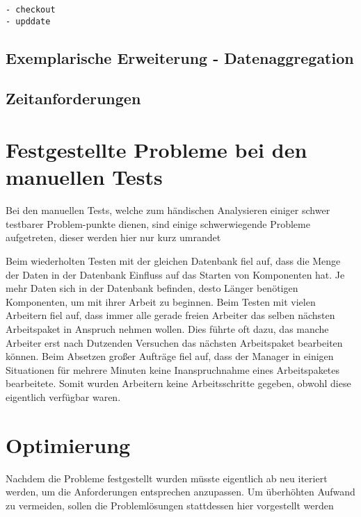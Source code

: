 \begin{verbatim}
- checkout
- upddate
\end{verbatim}

\subsection{Exemplarische Erweiterung - Datenaggregation}

\subsection{Zeitanforderungen}

\section{Festgestellte Probleme bei den manuellen Tests}

Bei den manuellen Tests, welche zum händischen Analysieren
einiger schwer testbarer Problem-punkte dienen,
sind einige schwerwiegende Probleme aufgetreten,
dieser werden hier nur kurz umrandet 

\begin{description}
        Beim wiederholten Testen mit der gleichen Datenbank fiel auf, dass die Menge der Daten in der Datenbank Einfluss auf das Starten von Komponenten hat. Je mehr Daten sich in der Datenbank befinden, desto Länger benötigen Komponenten, um mit ihrer Arbeit zu beginnen.
        Beim Testen mit vielen Arbeitern fiel auf, dass immer alle gerade freien Arbeiter das selben nächsten Arbeitspaket in Anspruch nehmen wollen. Dies führte oft dazu, das manche Arbeiter erst nach Dutzenden Versuchen das nächsten Arbeitspaket bearbeiten können.
        Beim Absetzen großer Aufträge fiel auf, dass der Manager in einigen Situationen für mehrere Minuten keine Inanspruchnahme eines Arbeitspaketes bearbeitete. Somit wurden Arbeitern keine Arbeitsschritte gegeben, obwohl diese eigentlich verfügbar waren.
\end{description}

\section{Optimierung}

Nachdem die Probleme festgestellt wurden
müsste eigentlich ab  neu iteriert werden,
um die Anforderungen entsprechen anzupassen.
Um überhöhten Aufwand zu vermeiden,
sollen die Problemlösungen stattdessen hier vorgestellt werden 


